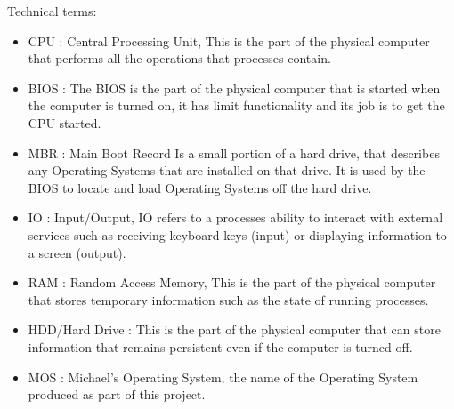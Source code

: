 \documentclass[a4paper]{report}
\begin{document}
\begin{minipage}{.5\textwidth}
  \centering
  Technical terms:
  \begin{itemize}
  \item CPU : Central Processing Unit, This is the part of the physical computer that performs all the operations that processes contain.
  \item BIOS : The BIOS is the part of the physical computer that is started when the computer is turned on, it has limit functionality and its job is to get the CPU started.
  \item MBR : Main Boot Record Is a small portion of a hard drive, that describes any Operating Systems that are installed on that drive. It is used by the BIOS to locate and load Operating Systems off the hard drive.
  \item IO : Input/Output, IO refers to a processes ability to interact with external services such as receiving keyboard keys (input) or displaying information to a screen (output).
  \item RAM : Random Access Memory, This is the part of the physical computer that stores temporary information such as the state of running processes.
  \item HDD/Hard Drive : This is the part of the physical computer that can store information that remains persistent even if the computer is turned off.
  \item MOS : Michael's Operating System, the name of the Operating System produced as part of this project.
  \end{itemize}
\end{minipage}%
\end{document}
